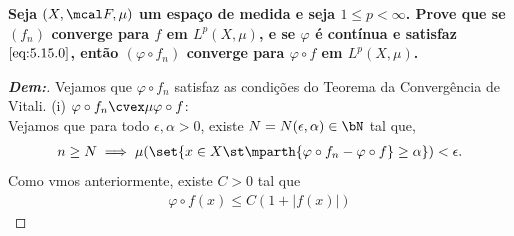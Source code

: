 \textbf{Seja $(X, \mcal F, \mu)$ um espaço de medida e seja $1 \le p < \infty$. 
Prove que se $(f_n)$ converge para $f$ em $L^p(X, \mu)$, e se $\varphi$ 
é contínua e satisfaz $\eqref{eq:5.15.0}$, então $(\varphi \circ f_n)$
converge para $\varphi \circ f$ em $L^p(X, \mu)$.}
\begin{proof}[\textbf{Dem:}] Vejamos que $\varphi \circ f_n$ satisfaz 
  as condições do Teorema da Convergência de Vitali. 
  (i) $\varphi \circ f_n \cvex \mu \varphi \circ f$: \\
  Vejamos que para todo $\epsilon, \alpha > 0$, existe $N = N(\epsilon, \alpha) \in \bN$
  tal que, 
  \begin{align*}
    n \ge N \implies \mu(\set{x \in X \st \mparth{\varphi \circ f_n
    - \varphi \circ f}\ge \alpha})<\epsilon.
  \end{align*}
  Como vmos anteriormente, existe $C > 0$ tal que
  \begin{align*}
    \varphi \circ f(x) \le C (1 + |f(x)|)
  \end{align*}
\end{proof}

